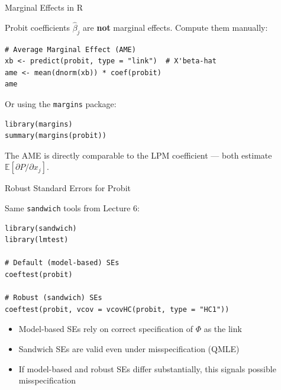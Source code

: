 \documentclass[aspectratio=169, handout, t]{beamer}
\numberwithin{equation}{section}
\begin{document}

\begin{frame}[fragile]{Marginal Effects in R}

Probit coefficients $\hat\beta_j$ are \textbf{not} marginal effects. Compute them manually:

\begin{lstlisting}
# Average Marginal Effect (AME)
xb <- predict(probit, type = "link")  # X'beta-hat
ame <- mean(dnorm(xb)) * coef(probit)
ame
\end{lstlisting}

\pause

\bigskip

Or using the \texttt{margins} package:

\begin{lstlisting}
library(margins)
summary(margins(probit))
\end{lstlisting}

\pause

The AME is directly comparable to the LPM coefficient --- both estimate $\mathbb{E}[\partial P / \partial x_j]$.

\end{frame}


\begin{frame}[fragile]{Robust Standard Errors for Probit}

Same \texttt{sandwich} tools from Lecture 6:

\begin{lstlisting}
library(sandwich)
library(lmtest)

# Default (model-based) SEs
coeftest(probit)

# Robust (sandwich) SEs
coeftest(probit, vcov = vcovHC(probit, type = "HC1"))
\end{lstlisting}

\pause

\bigskip

\begin{itemize}
    \item Model-based SEs rely on correct specification of $\Phi$ as the link
    \item Sandwich SEs are valid even under misspecification (QMLE)
    \item If model-based and robust SEs differ substantially, this signals possible misspecification
\end{itemize}

\end{frame}
\end{document}

